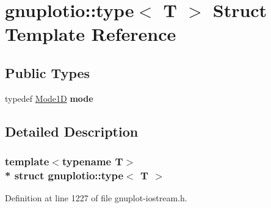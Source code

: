 \hypertarget{structgnuplotio_1_1_mode_auto_decoder_3_01_t_00_01typename_01boost_1_1enable__if__c_3_01_07_arraea646779afc1e35efaeffcebe81e18a0}{}\section{gnuplotio\+:\+:type$<$ T $>$ Struct Template Reference}
\label{structgnuplotio_1_1_mode_auto_decoder_3_01_t_00_01typename_01boost_1_1enable__if__c_3_01_07_arraea646779afc1e35efaeffcebe81e18a0}
\subsection*{Public Types}
\begin{DoxyCompactItemize}
\item 
typedef \hyperlink{structgnuplotio_1_1_mode1_d}{Mode1D} {\bfseries mode}\hypertarget{structgnuplotio_1_1_mode_auto_decoder_3_01_t_00_01typename_01boost_1_1enable__if__c_3_01_07_arraea646779afc1e35efaeffcebe81e18a0_a17dc2e2ec9d21833a8bd6f1a67e32e48}{}\label{structgnuplotio_1_1_mode_auto_decoder_3_01_t_00_01typename_01boost_1_1enable__if__c_3_01_07_arraea646779afc1e35efaeffcebe81e18a0_a17dc2e2ec9d21833a8bd6f1a67e32e48}

\end{DoxyCompactItemize}


\subsection{Detailed Description}
\subsubsection*{template$<$typename T$>$\\*
struct gnuplotio\+::type$<$ T $>$}



Definition at line 1227 of file gnuplot-\/iostream.\+h.

